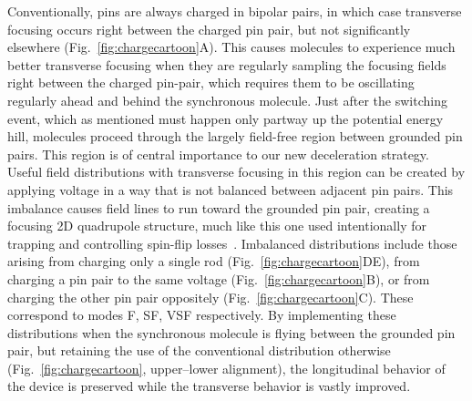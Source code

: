 \documentclass[%
 reprint,
 amsmath,amssymb,
 aps,
prl,
]{revtex4-1}
\begin{document}
Conventionally, pins are always charged in bipolar pairs, in which case transverse focusing occurs right between the charged pin pair, but not significantly elsewhere (Fig.~\ref{fig:chargecartoon}A).
This causes molecules to experience much better transverse focusing when they are regularly sampling the focusing fields right between the charged pin-pair, which requires them to be oscillating regularly ahead and behind the synchronous molecule.
Just after the switching event, which as mentioned must happen only partway up the potential energy hill, molecules proceed through the largely field-free region between grounded pin pairs.
This region is of central importance to our new deceleration strategy.
Useful field distributions with transverse focusing in this region can be created by applying voltage in a way that is not balanced between adjacent pin pairs. 
This imbalance causes field lines to run toward the grounded pin pair, creating a focusing 2D quadrupole structure, much like this one used intentionally for trapping and controlling spin-flip losses~\cite{Reens2017}.
Imbalanced distributions include those arising from charging only a single rod (Fig.~\ref{fig:chargecartoon}DE), from charging a pin pair to the same voltage (Fig.~\ref{fig:chargecartoon}B), or from charging the other pin pair oppositely (Fig.~\ref{fig:chargecartoon}C).
These correspond to modes F, SF, VSF respectively.
By implementing these distributions when the synchronous molecule is flying between the grounded pin pair, but retaining the use of the conventional distribution otherwise (Fig.~\ref{fig:chargecartoon}, upper--lower alignment), the longitudinal behavior of the device is preserved while the transverse behavior is vastly improved.
\end{document}
